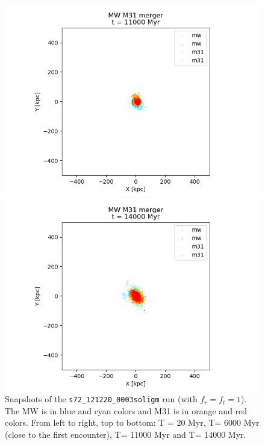 \documentclass[a4paper,12pt, english]{article}
\begin{document}
\begin{figure}[!h]
\begin{minipage}{0.48\textwidth}
\includegraphics[width=1\textwidth]{simulations-plots/merger_snapshots/mw_m31_diskbulge_merger_0550.png}
\end{minipage}
\begin{minipage}{0.48\textwidth}
  \centering
\includegraphics[width=1\textwidth]{simulations-plots/merger_snapshots/mw_m31_diskbulge_merger_0700.png}
\end{minipage}
\caption{Snapshots of the \texttt{s72\_121220\_0003soligm} run (with \(f_r = f_t = 1\)). The MW is in blue and cyan colors and M31 is in orange and red colors. From left to right, top to bottom: T = 20 Myr, T= 6000 Myr (close to the first encounter), T= 11000 Myr and T= 14000 Myr.}
\label{fig:merger-frames}
\end{figure}
\smallskip
\end{document}
